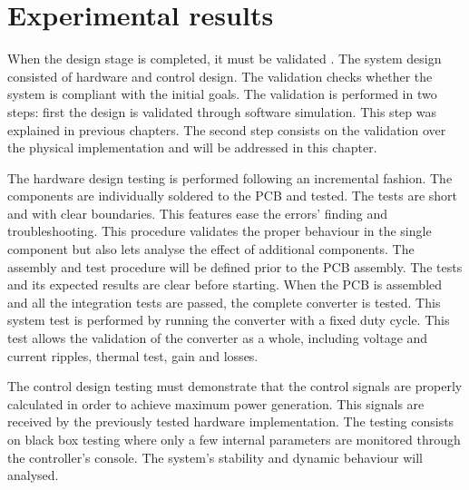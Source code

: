 
\chapter{Experimental results} \label{ch:test_validation}

When the design stage is completed, it must be validated . The system design consisted of hardware and control design. The validation checks whether the system is compliant with the initial goals. The validation is performed in two steps: first the design is validated through software simulation. This step was explained in previous chapters. The second step consists on the validation over the physical implementation and will be addressed in this chapter.

The hardware design testing is performed following an incremental fashion. The components are individually soldered to the PCB and tested. The tests are short and with clear boundaries. This features ease the errors' finding and troubleshooting. This procedure validates the proper behaviour in the single component but also lets analyse the effect of additional components. The assembly and test procedure will be defined prior to the PCB assembly. The tests and its expected results are clear before starting. When the PCB is assembled and all the integration tests are passed, the complete converter is tested. This system test is performed by running the converter with a fixed duty cycle. This test allows the validation of the converter as a whole, including voltage and current ripples, thermal test, gain and losses.

The control design testing must demonstrate that the control signals are properly calculated in order to achieve maximum power generation. This signals are received by the previously tested hardware implementation. The testing consists on black box testing where only a few internal parameters are monitored through the controller's console. The 
system's stability and dynamic behaviour will analysed.



